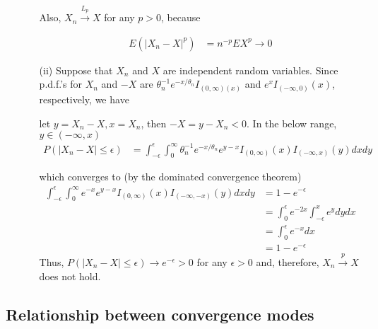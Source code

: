 \begin{itemize}
\begin{itemize}
Also, $X_n \xrightarrow {L_p} X$ for any $p > 0$, because

 \begin{align*}
	E(| X_n -X |^{p}) &= n^{-p} EX^{p} \rightarrow 0
\end{align*}

\item[(ii)] Suppose that $X_n$ and $X$ are independent random variables. Since p.d.f.'s for $X_n$ and $-X$ are $\theta_n^{-1} e^{-x/\theta_n} I_{(0,\infty)(x)}$ and $e^x I_{(-\infty, 0)} (x)$, respectively, we have

let $y = X_n -X, x= X_n$, then $-X = y-X_n < 0$. In the below range, $y \in (-\infty, x)$
 \begin{align*}
	P(| X_n -X | \leq \epsilon) &= \int_{-\epsilon}^{\epsilon} \int_{0}^{\infty} \theta_n^{-1} e^{-x/\theta_n} e^{y-x} I_{(0, \infty)}(x) I_{(-\infty, x)}(y)  dx dy
\end{align*}

which converges to (by the dominated convergence theorem)
 \begin{align*}
 \int_{-\epsilon}^{\epsilon} \int_{0}^{\infty}  e^{-x} e^{y-x} I_{(0, \infty)}(x) I_{(-\infty, -x)}(y)  dx dy & = 1- e^{-\epsilon} \\
&=  \int_{0}^{\epsilon}  e^{-2x} \int_{-\epsilon}^{x} e^y dy dx \\
&=  \int_{0}^{\epsilon} e^{-x} dx \\
&= 1- e^{-\epsilon} 
\end{align*}
Thus, $P(| X_n -X | \leq \epsilon) \rightarrow e^{-\epsilon} > 0$ for any $\epsilon > 0$ and, therefore, $X_n \xrightarrow {p} X$ does not hold.

\end{itemize}

\end{itemize}


\subsection{Relationship between convergence modes}


